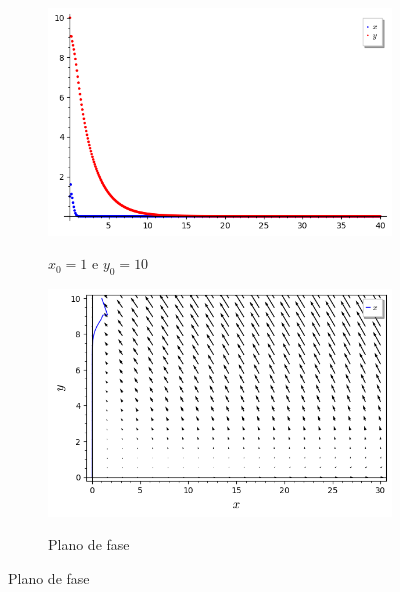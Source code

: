 \begin{figure}[H]
    \centering
    \begin{subfigure}{0.4\textwidth}
        \includegraphics[scale=0.48]{figuras/RM-cana (1,10) plot.png}
        \label{fig:RM-cana_3}
        \caption{$x_0 = 1$ e $y_0 = 10$}
    \end{subfigure}
    \begin{subfigure}{0.4\textwidth}
        \includegraphics[scale=0.48]{figuras/RM-cana (1,10) plano.png}
        \label{fig:RM-cana_4}
        \caption{Plano de fase}
    \end{subfigure}
\end{figure}

